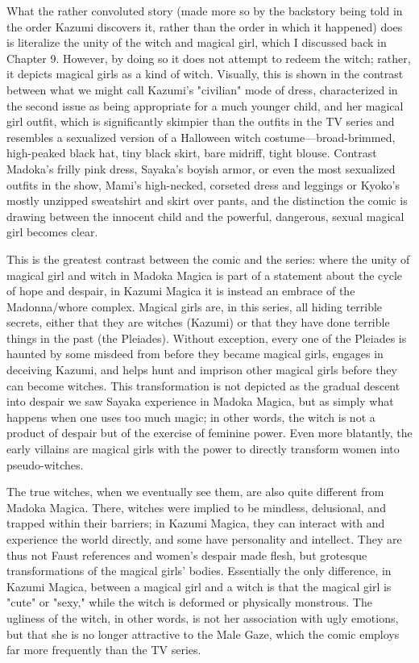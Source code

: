 What the rather convoluted story (made more so by the backstory being told in the order Kazumi discovers it, rather than the order in which it happened) does is literalize the unity of the witch and magical girl, which I discussed back in Chapter 9. However, by doing so it does not attempt to redeem the witch; rather, it depicts magical girls as a kind of witch. Visually, this is shown in the contrast between what we might call Kazumi's "civilian" mode of dress, characterized in the second issue as being appropriate for a much younger child, and her magical girl outfit, which is significantly skimpier than the outfits in the TV series and resembles a sexualized version of a Halloween witch costume—broad-brimmed, high-peaked black hat, tiny black skirt, bare midriff, tight blouse. Contrast Madoka's frilly pink dress, Sayaka's boyish armor, or even the most sexualized outfits in the show, Mami's high-necked, corseted dress and leggings or Kyoko's mostly unzipped sweatshirt and skirt over pants, and the distinction the comic is drawing between the innocent child and the powerful, dangerous, sexual magical girl becomes clear.

This is the greatest contrast between the comic and the series: where the unity of magical girl and witch in Madoka Magica is part of a statement about the cycle of hope and despair, in Kazumi Magica it is instead an embrace of the Madonna/whore complex. Magical girls are, in this series, all hiding terrible secrets, either that they are witches (Kazumi) or that they have done terrible things in the past (the Pleiades). Without exception, every one of the Pleiades is haunted by some misdeed from before they became magical girls, engages in deceiving Kazumi, and helps hunt and imprison other magical girls before they can become witches. This transformation is not depicted as the gradual descent into despair we saw Sayaka experience in Madoka Magica, but as simply what happens when one uses too much magic; in other words, the witch is not a product of despair but of the exercise of feminine power. Even more blatantly, the early villains are magical girls with the power to directly transform women into pseudo-witches.

The true witches, when we eventually see them, are also quite different from Madoka Magica. There, witches were implied to be mindless, delusional, and trapped within their barriers; in Kazumi Magica, they can interact with and experience the world directly, and some have personality and intellect. They are thus not Faust references and women's despair made flesh, but grotesque transformations of the magical girls' bodies. Essentially the only difference, in Kazumi Magica, between a magical girl and a witch is that the magical girl is "cute" or "sexy," while the witch is deformed or physically monstrous. The ugliness of the witch, in other words, is not her association with ugly emotions, but that she is no longer attractive to the Male Gaze, which the comic employs far more frequently than the TV series. 

